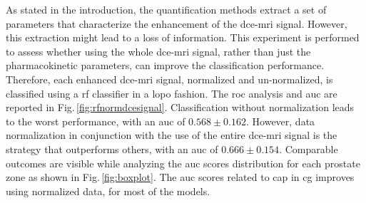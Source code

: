 As stated in the introduction, the quantification methods extract a
set of parameters that characterize the enhancement of the \ac{dce}-\ac{mri} signal.
However, this extraction might lead to a loss of information.
This experiment is performed to assess whether using the whole
\ac{dce}-\ac{mri} signal, rather than just the pharmacokinetic parameters, can improve the classification performance.
Therefore, each enhanced \ac{dce}-\ac{mri} signal, normalized and un-normalized, is classified using a \ac{rf} classifier in a \ac{lopo} fashion.
The \ac{roc} analysis and \ac{auc} are reported in Fig.\,\ref{fig:rfnormdcesignal}.
Classification without normalization leads to the worst performance,
with an \ac{auc} of $0.568 \pm 0.162$.
However, data normalization in conjunction with the use of the entire
\ac{dce}-\ac{mri} signal is the strategy that outperforms others,
with an \ac{auc} of $0.666 \pm 0.154$.
Comparable outcomes are visible while analyzing the \ac{auc}
scores distribution for each prostate zone as shown in
Fig.\,\ref{fig:boxplot}. The \ac{auc} scores
related to \ac{cap} in \ac{cg} improves using normalized data, for
most of the models.

